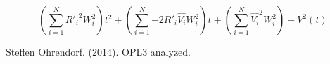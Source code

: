 \documentclass[twoside,twocolumn]{article}
\begin{document}
\begin{equation*}
(\sum_{i=1}^{N} {{R'_i}^2 W_i^2}) t^2 + (\sum_{i=1}^{N} {- 2 {R'_i} \hat{V_i} W_i^2}) t + (\sum_{i=1}^{N} {\hat{V_i}^2 W_i^2}) - V^2(t)
\end{equation*}


\begin{thebibliography}{99} %

Steffen Ohrendorf. (2014).
\newblock OPL3 analyzed.

\end{thebibliography}

\end{document}
